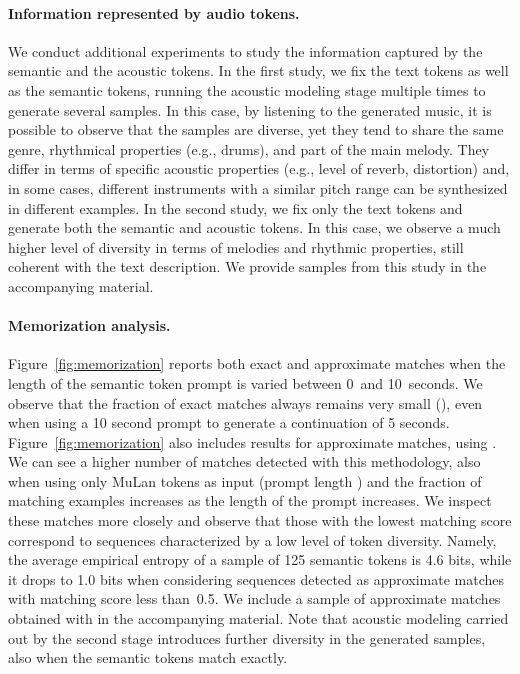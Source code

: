 \paragraph{Information represented by audio tokens.}
\label{results/semantic-vs-acoustic}
We conduct additional experiments to study the information captured by the semantic and the acoustic tokens. In the first study, we fix the {\mulan} text tokens as well as the semantic tokens, running the acoustic modeling stage multiple times to generate several samples. In this case, by listening to the generated music, it is possible to observe that the samples are diverse, yet they tend to share the same genre, rhythmical properties (e.g., drums), and part of the main melody. They differ in terms of specific acoustic properties (e.g., level of reverb, distortion) and, in some cases, different instruments with a similar pitch range can be synthesized in different examples. In the second study, we fix only the {\mulan} text tokens and generate both the semantic and acoustic tokens. In this case, we observe a much higher level of diversity in terms of melodies and rhythmic properties, still coherent with the text description. We provide samples from this study in the accompanying material. 

\paragraph{Memorization analysis.}
\label{results/memorization}
Figure~\ref{fig:memorization} reports both exact and approximate matches when the length of the semantic token prompt is varied between 0~and 10~seconds. We observe that the fraction of exact matches always remains very small (), even when using a 10 second prompt to generate a continuation of 5 seconds. Figure~\ref{fig:memorization} also includes results for approximate matches, using . We can see a higher number of matches detected with this methodology, also when using only MuLan tokens as input (prompt length ) and the fraction of matching examples increases as the length of the prompt increases. We inspect these matches more closely and observe that those with the lowest matching score correspond to sequences characterized by a low level of token diversity. Namely, the average empirical entropy of a sample of 125 semantic tokens is 4.6 bits, while it drops to 1.0 bits when considering sequences detected as approximate matches with matching score less than~0.5. We include a sample of approximate matches obtained with  in the accompanying material. Note that acoustic modeling carried out by the second stage introduces further diversity in the generated samples, also when the semantic tokens match exactly. 

